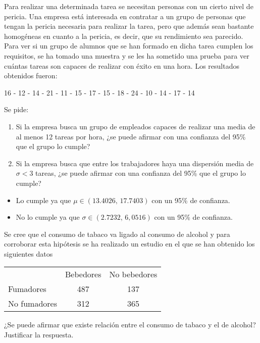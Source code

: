 {Para realizar una determinada tarea se necesitan personas con un cierto nivel de pericia.
Una empresa está interesada en contratar a un grupo de personas que tengan la pericia necesaria para realizar la tarea,
pero que además sean bastante homogéneas en cuanto a la pericia, es decir, que su rendimiento sea parecido.
Para ver si un grupo de alumnos que se han formado en dicha tarea cumplen los requisitos, se ha tomado una muestra y se
les ha sometido una prueba para ver cuántas tareas son capaces de realizar con éxito en una hora.
Los resultados obtenidos fueron:
\begin{center}
16 - 12 - 14 - 21 - 11 - 15 - 17 - 15 - 18 - 24 - 10 - 14 - 17 - 14 
\end{center}
Se pide: 
\begin{enumerate}
\item Si la empresa busca un grupo de empleados capaces de realizar una media de al menos 12 tareas por hora, ¿se puede
afirmar con una confianza del 95\% que el grupo lo cumple?
\item Si la empresa busca que entre los trabajadores haya una dispersión media de $\sigma<3$ tareas, ¿se puede afirmar
con una confianza del 95\% que el grupo lo cumple? 
\end{enumerate} 
}
{
\begin{itemize}
\item Lo cumple ya que $\mu\in (13.4026,\,17.7403)$ con un 95\% de confianza.
\item No lo cumple ya que $\sigma \in (2.7232,\,6,0516)$ con un 95\% de confianza.
\end{itemize}
}
{}


{Se cree que el consumo de tabaco va ligado al consumo de alcohol y para corroborar esta hipótesis se ha realizado un
estudio en el que se han obtenido los siguientes datos
\begin{center}
\begin{tabular}{lcc}
 & Bebedores & No bebedores\\
\cline{2-3}
Fumadores & \multicolumn{1}{|c}{487} & \multicolumn{1}{c|}{137} \\
No fumadores & \multicolumn{1}{|c}{312} & \multicolumn{1}{c|}{365}\\
\cline{2-3}
\end{tabular}
\end{center}
¿Se puede afirmar que existe relación entre el consumo de tabaco y el de alcohol?
Justificar la respuesta.
}
{}
{}


